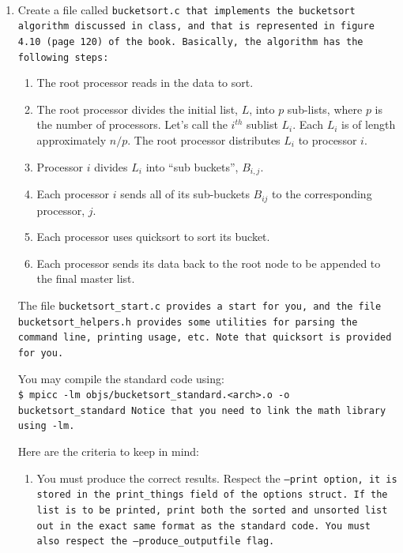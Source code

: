 \documentclass{article}
\begin{document}
\\
\begin{enumerate}
\item Create a file called \tt{bucketsort.c} that implements the
  bucketsort algorithm discussed in class, and that is represented in
  figure 4.10 (page 120) of the book.  Basically, the algorithm has
  the following steps:
  \begin{enumerate}
  \item The root processor reads in the data to sort.  
  \item The root processor divides the initial list, $L$, into $p$
    sub-lists, where $p$ is the number of processors. Let's call the
    $i^{th}$ sublist $L_i$. Each $L_i$ is  of length approximately
    $n/p$.  The root processor distributes $L_i$ to processor $i$. 
  \item Processor $i$ divides $L_i$ into ``sub buckets'',
    $B_{i,j}$.
    
  \item Each processor $i$ sends all of its sub-buckets $B_{ij}$ to
    the corresponding processor, $j$. 

  \item Each processor uses quicksort to sort its bucket.
    
  \item Each processor sends its data back to the root node to be
    appended to the final master list. 
  \end{enumerate}

The file \tt{bucketsort\_start.c} provides a start for you, and the
file \tt{bucketsort\_helpers.h} provides some utilities for parsing
the command line, printing usage, etc.  Note that \tt{quicksort} is
provided for you. 

You may compile the standard code using:\\
\tt{\$ mpicc -lm objs/bucketsort\_standard.<arch>.o -o
  bucketsort\_standard}
Notice that you need to link the math library using \tt{-lm}.

Here are the criteria to keep in mind:
\begin{enumerate}
\item You must produce the correct results.  Respect the \tt{--print}
  option, it is stored in the \tt{print\_things} field of the options
  struct. If the list is to be printed, print both the sorted and
  unsorted list out in the
  exact same format as the standard code. You must also respect the
  \tt{--produce\_outputfile} flag. 


\end{enumerate}
\end{enumerate}
\end{document}

